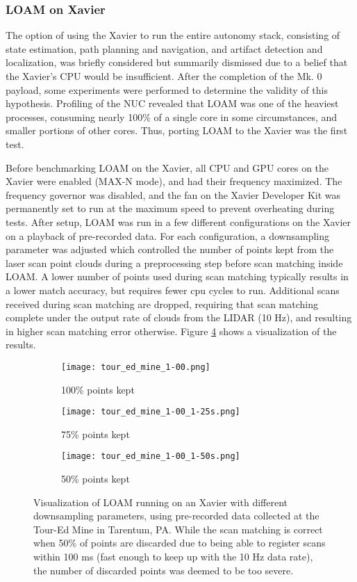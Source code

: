 \subsubsection{LOAM on Xavier}

The option of using the Xavier to run the entire autonomy stack, consisting of state estimation, path planning and navigation, and artifact detection and localization, was briefly considered but summarily dismissed due to a belief that the Xavier's CPU would be insufficient. After the completion of the Mk. 0 payload, some experiments were performed to determine the validity of this hypothesis. Profiling of the NUC revealed that LOAM was one of the heaviest processes, consuming nearly 100\% of a single core in some circumstances, and smaller portions of other cores. Thus, porting LOAM to the Xavier was the first test.

Before benchmarking LOAM on the Xavier, all CPU and GPU cores on the Xavier were enabled (MAX-N mode), and had their frequency maximized. The frequency governor was disabled, and the fan on the Xavier Developer Kit was permanently set to run at the maximum speed to prevent overheating during tests. After setup, LOAM was run in a few different configurations on the Xavier on a playback of pre-recorded data. For each configuration, a downsampling parameter was adjusted which controlled the number of points kept from the laser scan point clouds during a preprocessing step before scan matching inside LOAM. A lower number of points used during scan matching typically results in a lower match accuracy, but requires fewer cpu cycles to run. Additional scans received during scan matching are dropped, requiring that scan matching complete under the output rate of clouds from the LIDAR (10 Hz), and resulting in higher scan matching error otherwise. Figure \ref{loam_xavier} shows a visualization of the results.

\begin{figure}
	\centering
	\begin{subfigure}{0.32\textwidth}
		\texttt{[image: tour\_ed\_mine\_1-00.png]}
		\caption{100\% points kept}
		\label{loam_xavier_100}
	\end{subfigure}		
	\hfill
	\begin{subfigure}{0.32\textwidth}
		\texttt{[image: tour\_ed\_mine\_1-00\_1-25s.png]}
		\caption{75\% points kept}
		\label{loam_xavier_75}		
	\end{subfigure}
	\hfill
	\begin{subfigure}{0.32\textwidth}
		\texttt{[image: tour\_ed\_mine\_1-00\_1-50s.png]}
		\caption{50\% points kept}
		\label{loam_xavier_50}
	\end{subfigure}	
	\caption[Visualization of LOAM running on an Xavier]{Visualization of LOAM running on an Xavier with different downsampling parameters, using pre-recorded data collected at the Tour-Ed Mine in Tarentum, PA. While the scan matching is correct when 50\% of points are discarded due to being able to register scans within 100 ms (fast enough to keep up with the 10 Hz data rate), the number of discarded points was deemed to be too severe.}
	\label{loam_xavier}
\end{figure}

